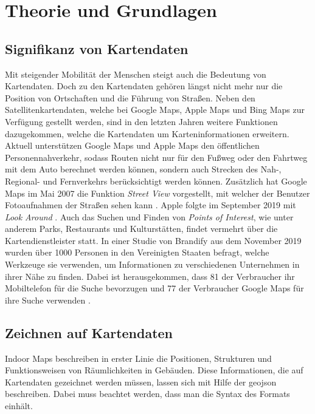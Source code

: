 \chapter{Theorie und Grundlagen}
\label{ch:theorybasics}
\section{Signifikanz von Kartendaten}
Mit steigender Mobilität der Menschen steigt auch die Bedeutung von Kartendaten.
Doch zu den Kartendaten gehören längst nicht mehr nur die Position von Ortschaften und die Führung von Straßen.
Neben den Satellitenkartendaten, welche bei Google Maps, Apple Maps und Bing Maps zur Verfügung gestellt werden, sind in den letzten Jahren weitere Funktionen dazugekommen, welche die Kartendaten um Karteninformationen erweitern.
Aktuell unterstützen Google Maps und Apple Maps den öffentlichen Personennahverkehr, sodass Routen nicht nur für den Fußweg oder den Fahrtweg mit dem Auto berechnet werden können, sondern auch Strecken des Nah-, Regional- und Fernverkehrs berücksichtigt werden können.
Zusätzlich hat Google Maps im Mai 2007 die Funktion \emph{Street View} vorgestellt, mit welcher der Benutzer Fotoaufnahmen der Straßen sehen kann \parencite{PUD2007}.
Apple folgte im September 2019 mit \emph{Look Around} \parencite{APP2019}.\pbreak%
%
Auch das Suchen und Finden von \emph{Points of Interest}, wie unter anderem Parks, Restaurants und Kulturstätten, findet vermehrt über die Kartendienstleister statt.
In einer Studie von Brandify aus dem November 2019 wurden über 1000 Personen in den Vereinigten Staaten befragt, welche Werkzeuge sie verwenden, um Informationen zu verschiedenen Unternehmen in ihrer Nähe zu finden.
Dabei ist herausgekommen, dass \SI{81}{\prc} der Verbraucher ihr Mobiltelefon für die Suche bevorzugen und \SI{77}{\prc} der Verbraucher Google Maps für ihre Suche verwenden \parencite{ROL2019}.

\section{Zeichnen auf Kartendaten}
Indoor Maps beschreiben in erster Linie die Positionen, Strukturen und Funktionsweisen von Räumlichkeiten in Gebäuden.
Diese Informationen, die auf Kartendaten gezeichnet werden müssen, lassen sich mit Hilfe der \acs{geojson} beschreiben.
Dabei muss beachtet werden, dass man die Syntax des Formats einhält.

